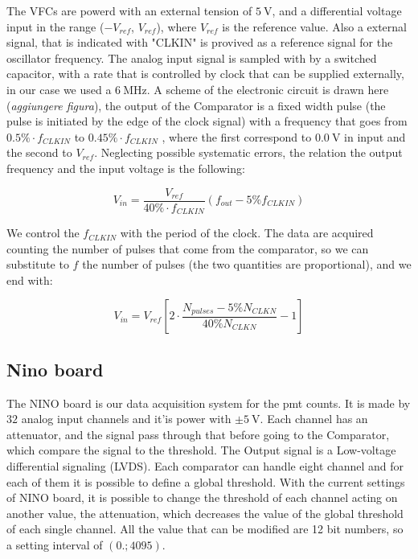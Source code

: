 The VFCs are powerd with an external tension of $\SI{5}{\volt}$, and a differential voltage input in the range ($-V_{ref}$, $V_{ref}$), where $V_{ref}$ is the reference value. Also a external signal, that is indicated with "CLKIN" is provived as a reference signal for the oscillator frequency.
The analog input signal is sampled with by a switched capacitor, with a rate that is controlled by clock  that can be supplied externally, in our case we used a $\SI{6}{\mega \hertz}$. A scheme of the electronic circuit is drawn here (\textit{aggiungere figura}), the output of the Comparator  is a fixed width pulse (the pulse is initiated by the edge of the clock signal) with a frequency that goes from $0.5 \% \cdot f_{CLKIN}$ to $0.45 \% \cdot f_{CLKIN}$ \cite{VfcDatasheet}, where the first correspond to $\SI{0.0}{ \volt}$ in input and the second to $V_{ref}$. Neglecting possible systematic errors, the relation the output frequency and the input voltage is the following:

\begin{equation}
V_{in} = \frac{V_{ref}}{40 \% \cdot f_{CLKIN}} (f_{out} - 5\% f_{CLKIN})
\end{equation}

We control the $f_{CLKIN}$ with the period of the clock. The data are acquired counting the number of pulses that come from the comparator, so we can substitute to $f$ the number of pulses (the two quantities are proportional), and we end with:

\begin{equation}
V_{in} =  V_{ref}[2 \cdot \dfrac{N_{pulses} - 5 \% N_{CLKN}}{40 \% N_{CLKN}} - 1]
\end{equation}

\subsection{Nino board}
The NINO board is our data acquisition system for the pmt counts. It is made by $32$ analog input channels and it'is power with $\pm \SI{5}{\volt}$. Each channel has an attenuator, and the signal pass through that before going to the Comparator, which compare the signal to the threshold. The Output signal is a Low-voltage differential signaling (LVDS). Each comparator can handle eight channel and for each of them it is possible to define a global threshold. With the current settings of NINO board, it is possible to change the threshold of each channel acting on another value, the attenuation, which decreases the value of the global threshold of each single channel. All the value that can be modified are 12 bit numbers, so a setting interval of $(0. ; 4095)$.

